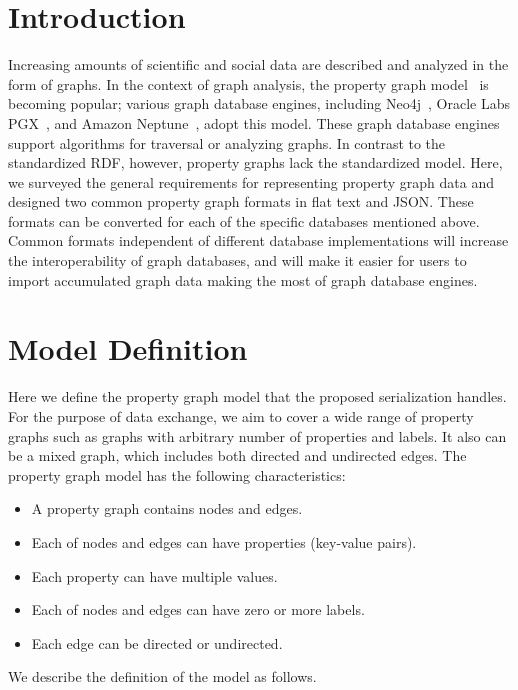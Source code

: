 \documentclass[runningheads]{llncs}
\begin{document}
\section{Introduction}
Increasing amounts of scientific and social data are described and analyzed in the form of graphs.
In the context of graph analysis, the property graph model~\cite{angles} is becoming popular; various graph database engines, including Neo4j~\cite{neo4j}, Oracle Labs PGX~\cite{pgx}, and Amazon Neptune~\cite{neptune}, adopt this model. These graph database engines support algorithms for traversal or analyzing graphs. 
In contrast to the standardized RDF, however, 
property graphs lack the standardized model.
Here, we surveyed the general requirements for representing property graph data and designed two common property graph formats in flat text and JSON. These formats can be converted for each of the specific databases mentioned above. Common formats independent of different database implementations will increase the interoperability of graph databases, and will make it easier for users to import accumulated graph data making the most of graph database engines.

\section{Model Definition}
Here we define the property graph model that the proposed serialization handles.
For the purpose of data exchange, we aim to cover a wide range of property graphs such as graphs with arbitrary number of properties and labels. It also can be a mixed graph, which includes both directed and undirected edges. The property graph model has the following characteristics:

\begin{itemize}
    \item A property graph contains nodes and edges.
    \item Each of nodes and edges can have properties (key-value pairs).
    \item Each property can have multiple values.
    \item Each of nodes and edges can have zero or more labels.
    \item Each edge can be directed or undirected.
\end{itemize}
We describe the definition of the model as follows.
\end{document}
